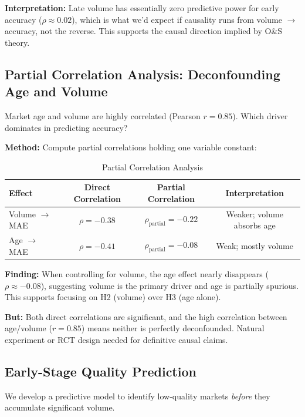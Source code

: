 \documentclass[12pt,letterpaper]{article}
\begin{document}
\textbf{Interpretation:} Late volume has essentially zero predictive power for early accuracy ($\rho \approx 0.02$), which is what we'd expect if causality runs from volume $\rightarrow$ accuracy, not the reverse. This supports the causal direction implied by O\&S theory.

\subsection{Partial Correlation Analysis: Deconfounding Age and Volume}

Market age and volume are highly correlated (Pearson $r = 0.85$). Which driver dominates in predicting accuracy?

\textbf{Method:} Compute partial correlations holding one variable constant:

\begin{table}[ht]
\centering
\caption{Partial Correlation Analysis}
\label{tab:partial}
\begin{tabular}{lccc}
\toprule
\textbf{Effect} & \textbf{Direct Correlation} & \textbf{Partial Correlation} & \textbf{Interpretation} \\
\midrule
Volume $\rightarrow$ MAE & $\rho = -0.38$ & $\rho_{\text{partial}} = -0.22$ & Weaker; volume absorbs age \\
Age $\rightarrow$ MAE & $\rho = -0.41$ & $\rho_{\text{partial}} = -0.08$ & Weak; mostly volume \\
\bottomrule
\end{tabular}
\end{table}

\textbf{Finding:} When controlling for volume, the age effect nearly disappears ($\rho \approx -0.08$), suggesting volume is the primary driver and age is partially spurious. This supports focusing on H2 (volume) over H3 (age alone).

\textbf{But:} Both direct correlations are significant, and the high correlation between age/volume ($r = 0.85$) means neither is perfectly deconfounded. Natural experiment or RCT design needed for definitive causal claims.

\subsection{Early-Stage Quality Prediction}\label{sec:appendix-early-prediction}

We develop a predictive model to identify low-quality markets \textit{before} they 
accumulate significant volume.
\end{document}
